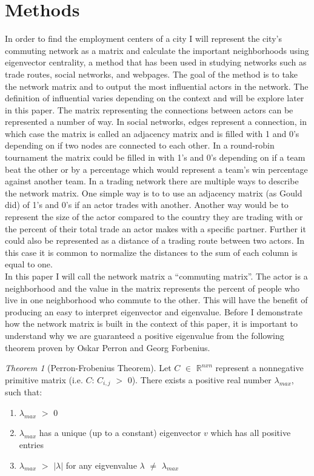 \documentclass{article}
\theoremstyle{definition}
\theoremstyle{remark}
\newtheorem{theorem}{Theorem}
\begin{document}
\section{Methods}
In order to find the employment centers of a city I will represent the city's commuting network as a matrix and calculate the important neighborhoods using eigenvector centrality, a method that has been used in studying networks such as trade routes, social networks, and webpages.  The goal of the method is to take the network matrix and to output the most influential actors in the network.  The definition of influential varies depending on the context and will be explore later in this paper.  The matrix representing the connections between actors can be represented a number of way.  In social networks, edges represent a connection, in which case the matrix is called an adjacency matrix and is filled with 1 and 0’s depending on if two nodes are connected to each other.  In a round-robin tournament the matrix could be filled in with 1's and 0's depending on if a team beat the other or by a percentage which would represent a team's win percentage against another team.  In a trading network there are multiple ways to describe the network matrix.  One simple way is to to use an adjacency matrix (as Gould did) of 1's and 0's if an actor trades with another.  Another way would be to represent the size of the actor compared to the country they are trading with or the percent of their total trade an actor makes with a specific partner.  Further it could also be represented as a distance of a trading route between two actors.  In this case it is common to normalize the distances to the sum of each column is equal to one. \\

In this paper I will call the network matrix a ``commuting matrix''.  The actor is a neighborhood and the value in the matrix represents the percent of people who live in one neighborhood who commute to the other.  This will have the benefit of producing an easy to interpret eigenvector and eigenvalue.  Before I demonstrate how the network matrix is built in the context of this paper, it is important to understand why we are guaranteed a positive eigenvalue from the following theorem proven by Oskar Perron and Georg Forbenius.

\theoremstyle{definition}
\begin{theorem}[Perron-Frobenius Theorem]
\label{Perron-Frobenius Theorem}
Let $C$ $\in$ $\mathbb{R}^{nxn}$ represent a nonnegative primitive matrix (i.e. $C$: $C_{i,j}$ $>$ 0).  There exists a positive real number $\lambda_{max}$, such that:
\begin{enumerate}
\item $\lambda_{max}$ $>$ 0
\item $\lambda_{max}$ has a unique (up to a constant) eigenvector $v$ which has all positive entries
\item $\lambda_{max}$ $>$ $|\lambda|$ for any eigvenvalue $\lambda$ $\neq$ $\lambda_{max}$
\end{enumerate}

\end{theorem}
\end{document}
